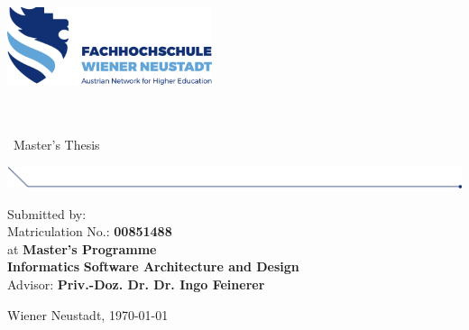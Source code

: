 
\makeatletter

\begin{titlepage}

  \includegraphics[width=6cm]{images/fhwn-logo.png}

  \vspace{200pt}
  {\noindent\color{header-blue}\Huge\textbf{\@title}}\\
  \vspace{5pt}\\
  {\noindent\LARGE~Master's Thesis}
  \vspace{20pt}

  \hspace{-35mm}
  \includegraphics[width=18.67cm]{images/titlepage-line.png}

  \vspace{15pt}

  \tabto{2cm}Submitted by: \tabto{7cm}\textbf{\@author} \\
  \tabto{2cm}Matriculation No.: \tabto{7cm}\textbf{00851488} \\
  \vspace{15pt}
  \tabto{2cm}at \tabto{7cm}\textbf{Master's Programme}\\
  \tabto{7cm}\textbf{Informatics}
  \tabto{7cm}\textbf{Software Architecture and Design} \\
  \vspace{15pt}
  \tabto{2cm}Advisor: \tabto{7cm}\textbf{Priv.-Doz. Dr. Dr. Ingo Feinerer}

  \vfill

  Wiener Neustadt, \today
      
\end{titlepage}
\makeatother

